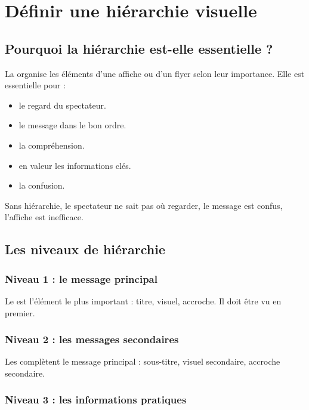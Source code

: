 \section{Définir une hiérarchie visuelle}

\subsection{Pourquoi la hiérarchie est-elle essentielle ?}

La  organise les éléments d'une affiche ou d'un flyer selon leur importance. Elle est essentielle pour :

\begin{itemize}
    \item {} le regard du spectateur.
    \item {} le message dans le bon ordre.
    \item {} la compréhension.
    \item {} en valeur les informations clés.
    \item {} la confusion.
\end{itemize}

Sans hiérarchie, le spectateur ne sait pas où regarder, le message est confus, l'affiche est inefficace.

\subsection{Les niveaux de hiérarchie}

\subsubsection{Niveau 1 : le message principal}

Le  est l'élément le plus important : titre, visuel, accroche. Il doit être vu en premier.

\subsubsection{Niveau 2 : les messages secondaires}

Les  complètent le message principal : sous-titre, visuel secondaire, accroche secondaire.

\subsubsection{Niveau 3 : les informations pratiques}

